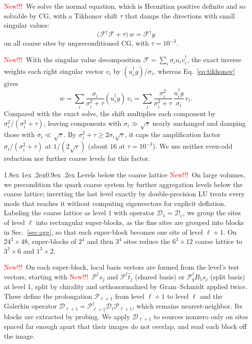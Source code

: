 \documentclass[11pt,a4paper]{article}
\makeatletter
\newif\ifshownew \shownewtrue
\DeclareRobustCommand\New{\ifshownew\textcolor{red}{New!!!}\ \else\ignorespaces\fi}
\renewcommand\subsubsection{\@startsection{subsubsection}{3}{\z@}%
  {1.8ex \@plus 1ex \@minus .2ex}{0.9ex \@plus .2ex}%
  {\centering\normalfont\small\bfseries\itshape}}
\numberwithin{equation}{section}
\newcommand{\dg}{^{\dagger}}
\newcommand{\Pro}{\mathcal P}
\newcommand{\Pq}{\Pro_q}
\newcommand{\Dc}{\mathcal D_{\mathrm c}}
\makeatother
\begin{document}
\New We solve the normal equation, which is Hermitian positive definite and so solvable by CG,
with a Tikhonov shift $\tau$ that damps the directions with small singular values:
\begin{equation}
\big(\mathcal F\dg \mathcal F+\tau\big)\,w=\mathcal F\dg g
\label{eq:tikhonov}
\end{equation}
on all coarse sites by unpreconditioned CG, with $\tau=10^{-3}$.

\New With the singular value decomposition $\mathcal F=\sum_i\sigma_iu_iv_i\dg$, the exact inverse
weights each right singular vector $v_i$ by $(u_i\dg g)/\sigma_i$, whereas Eq.~\eqref{eq:tikhonov}
gives
\begin{equation*}
w=\sum_i\frac{\sigma_i}{\sigma_i^2+\tau}(u_i\dg g)\,v_i
=\sum_i\frac{\sigma_i^2}{\sigma_i^2+\tau}\,\frac{u_i\dg g}{\sigma_i}\,v_i .
\end{equation*}
Compared with the exact solve, the shift multiplies each component by $\sigma_i^2/(\sigma_i^2+\tau)$,
leaving components with $\sigma_i\gg\sqrt\tau$ nearly unchanged and damping those with
$\sigma_i\ll\sqrt\tau$. By $\sigma_i^2+\tau\ge2\sigma_i\sqrt\tau$, it caps the amplification factor
$\sigma_i/(\sigma_i^2+\tau)$ at $1/(2\sqrt\tau)$ (about $16$ at $\tau=10^{-3}$). We use neither
even-odd reduction nor further coarse levels for this factor.

\subsubsection{Levels below the coarse lattice}
\New On large volumes, we precondition the quark coarse system by further aggregation levels below
the coarse lattice; inverting the last level exactly by double-precision LU treats every mode that
reaches it without computing eigenvectors for explicit deflation. Labeling the coarse lattice as
level $1$ with operator $\mathcal D_1=\Dc$, we group the sites of level $\ell$ into rectangular
super-blocks, as the fine sites are grouped into blocks in Sec.~\ref{sec:agg}, so that each
super-block becomes one site of level $\ell+1$. On $24^3\times48$, super-blocks of $2^4$ and then
$3^4$ sites reduce the $6^3\times12$ coarse lattice to $3^3\times6$ and $1^3\times2$.

\New On each super-block, local basis vectors are formed from the level's test vectors, starting
with \New $\Pro\dg s_j$ and $\Pro\dg\hat t_j$ (shared basis) or $\Pq\dg B_5s_j$ (split basis) at
level $1$, split by chirality and orthonormalized by
Gram--Schmidt applied twice. These define the prolongation $\Pro_{\ell+1}$ from level $\ell+1$ to
level $\ell$ and the Galerkin operator
$\mathcal D_{\ell+1}=\Pro_{\ell+1}\dg\mathcal D_\ell\Pro_{\ell+1}$, which remains nearest-neighbor.
Its blocks are extracted by probing. We apply $\mathcal D_{\ell+1}$ to sources nonzero only on sites
spaced far enough apart that their images do not overlap, and read each block off the image.
\end{document}

